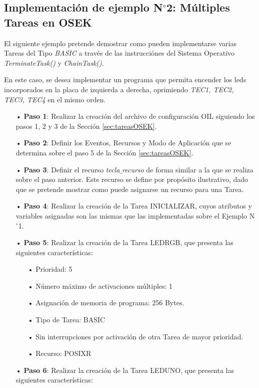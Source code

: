 \documentclass[12pt,letterpaper]{article}
\begin{document}
\subsection{Implementación de ejemplo N$^{\circ}$2: Múltiples Tareas en OSEK}

El siguiente ejemplo pretende demostrar como pueden implementarse varias Tareas del Tipo \textit{BASIC} a través de las instrucciónes del Sistema Operativo \textit{TerminateTask()} y \textit{ChainTask()}.

En este caso, se desea implementar un programa que  permita encender los leds incorporados en la placa de izquierda a derecha, oprimiendo \textit{TEC1, TEC2, TEC3, TEC4} en el mismo orden.
\begin{enumerate}
\item[•]\textbf{Paso 1}: Realizar la creación del archivo de configuración OIL siguiendo los pasos 1, 2 y 3 de la Sección \ref{sec:tareasOSEK}.
\item[•]\textbf{Paso 2}: Definir los Eventos, Recursos y Modo de Aplicación que se determina sobre el paso 5 de la Sección \ref{sec:tareasOSEK}.
\item[•]\textbf{Paso 3}: Definir el recurso \textit{tecla$\_$recurso} de forma similar a la que se realiza sobre el paso anterior. Este recurso se define por propósito ilustrativo, dado que se pretende mostrar como puede asignarse un recurso para una Tarea.
\item[•]\textbf{Paso 4}: Realizar la creación de la Tarea INICIALIZAR, cuyos atributos y variables asignadas son las mismas que las implementadas sobre el Ejemplo N$^{\circ}$1.
\item[•]\textbf{Paso 5}: Realizar la creación de la Tarea LEDRGB, que presenta las siguientes características:
\begin{enumerate}
\item[•]Prioridad: 5
\item[•]Número máximo de activaciones múltiples: 1
\item[•]Asignación de memoria de programa: 256 Bytes.
\item[•]Tipo de Tarea: BASIC
\item[•]Sin interrupciones por activación de otra Tarea de mayor prioridad.
\item[•]Recurso: POSIXR
\end{enumerate}
\item[•]\textbf{Paso 6}: Realizar la creación de la Tarea LEDUNO, que presenta las siguientes características:
\begin{enumerate}

\end{enumerate}
\end{enumerate}
\end{document}
